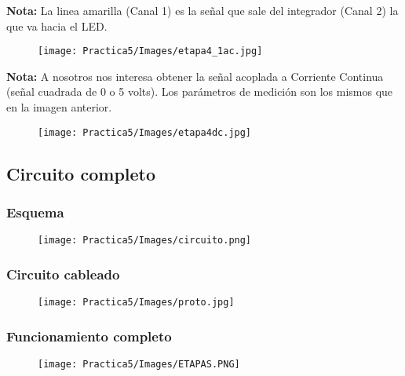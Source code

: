 \documentclass[12pt]{article}
\begin{document}
            \textbf{Nota:} La linea amarilla (Canal 1) es la señal que sale del integrador (Canal 2) la que va hacia el LED.
         
            \begin{figure}[h!]
                \centering
                \texttt{[image: Practica5/Images/etapa4\_1ac.jpg]}
            \end{figure}
            
            \newpage
            \textbf{Nota:} A nosotros nos interesa obtener la señal acoplada a Corriente Continua (señal cuadrada de 0 o 5 volts). Los parámetros de medición son los mismos que en la imagen anterior.
         
            \begin{figure}[h!]
                \centering
                \texttt{[image: Practica5/Images/etapa4dc.jpg]}
            \end{figure}
            
            \subsection{Circuito completo}
            \subsubsection{Esquema}
            \begin{figure}[h!]
                \centering
                \texttt{[image: Practica5/Images/circuito.png]}
            \end{figure}
            
            \newpage
            \subsubsection{Circuito cableado}
            \begin{figure}[h!]
            \centering
                \texttt{[image: Practica5/Images/proto.jpg]}
            \end{figure}
            
            \subsubsection{Funcionamiento completo}
            \begin{figure}[h!]
                \centering
                \texttt{[image: Practica5/Images/ETAPAS.PNG]}
            \end{figure}
\end{document}
